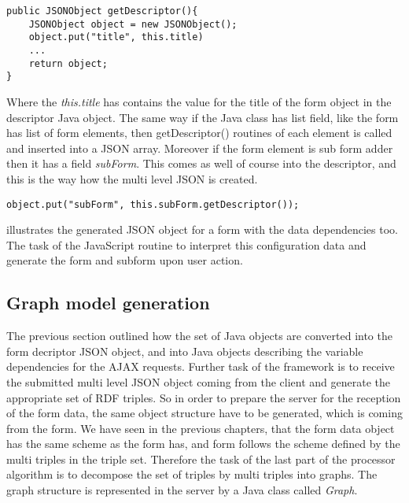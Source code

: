 \begin{lstlisting}[basicstyle=\footnotesize, frame=single, caption={Java to JSON}, captionpos=b, belowskip=1em, aboveskip=2em]
public JSONObject getDescriptor(){
	JSONObject object = new JSONObject();
	object.put("title", this.title)
	... 
	return object;	
}
\end{lstlisting}

Where the \textit{this.title} has contains the value for the title of the form object in the descriptor Java object. The same way if the Java class has list field, like the form has list of form elements, then getDescriptor() routines of each element is called and inserted into a JSON array. Moreover if the form element is sub form adder then it has a field \textit{subForm}. This comes as well of course into the descriptor, and this is the way how the multi level JSON is created.


\begin{lstlisting}[basicstyle=\footnotesize, frame=single, caption={Subform descriptor}, captionpos=b, belowskip=1em, aboveskip=2em]
	object.put("subForm", this.subForm.getDescriptor());
\end{lstlisting}


 illustrates the generated JSON object for a form with the data dependencies too. The task of the JavaScript routine to interpret this configuration data and generate the form and subform upon user action.



\subsection{Graph model generation}  \label{513}


The previous section outlined how the set of Java objects are converted into the form decriptor JSON object, and into Java objects describing the variable dependencies for the AJAX requests. Further task of the framework is to receive the submitted multi level JSON object coming from the client and generate the appropriate set of RDF triples. So in order to prepare the server for the reception of the form data, the same object structure have to be generated, which is coming from the form. We have seen in the previous chapters, that the form data object has the same scheme as the form has, and form follows the scheme defined by the multi triples in the triple set. Therefore the task of the last part of the processor algorithm is to decompose the set of triples by multi triples into graphs. The graph structure is represented in the server by a Java class called \textit{Graph}. 

